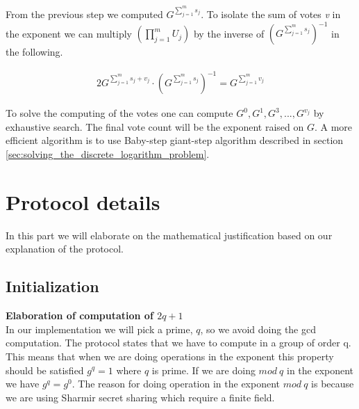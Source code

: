 \noindent
From the previous step we computed $G^{ \sum\limits_{j=1}^m s_j}$. To  isolate the sum of votes \textit{v} in the exponent we can multiply  $(\prod\limits_{j=1}^{m} U_{j})$ by the inverse of $(G^{ \sum\limits_{j=1}^m s_j})^{-1}$ in the following.

\begin{alignat*}{2}
 G^{ \sum\limits_{j=1}^m s_j +v_j} \cdot (G^{ \sum\limits_{j=1}^m s_j})^{-1} = G^{ \sum\limits_{j=1}^m v_j}
\end{alignat*}


\noindent
To solve the computing of the votes one can compute \begin{math}G^0, G^1, G^3,..., G^{v_j} \end{math} by exhaustive search. The final vote count will be the exponent raised on $G$. A more efficient algorithm is to use Baby-step giant-step algorithm described in section \ref{sec:solving_the_discrete_logarithm_problem}. 

\section{Protocol details} \label{sec:protocol_details}
In this part we will elaborate on the mathematical justification based on our explanation of the protocol.  


\subsection{Initialization} \label{sec:protocol_details_initialization}
\textbf{Elaboration of computation of  $2q+1$}\\
In our implementation we will pick a prime, \begin{math}q\end{math}, so we avoid doing the gcd computation. The protocol states that we have to compute in a group of order q. This means that when we are doing operations in the exponent this property should be satisfied \begin{math}g^q=1\end{math} where \begin{math}q\end{math} is prime. If we are doing \begin{math}mod \ q \end{math} in the exponent we have \begin{math}g^q=g^0\end{math}. The reason for doing operation in the exponent \begin{math}mod \ q\end{math} is because we are using Sharmir secret sharing which require a finite field.\\

